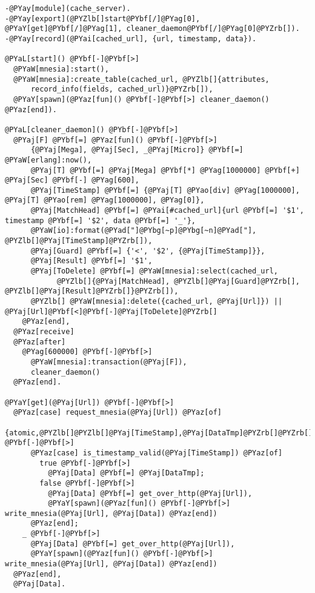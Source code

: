 \begin{Verbatim}[commandchars=@\[\]]
-@PYay[module](cache_server).
-@PYay[export](@PYZlb[]start@PYbf[/]@PYag[0], @PYaY[get]@PYbf[/]@PYag[1], cleaner_daemon@PYbf[/]@PYag[0]@PYZrb[]).
-@PYay[record](@PYai[cached_url], {url, timestamp, data}).

@PYaL[start]() @PYbf[-]@PYbf[>]
  @PYaW[mnesia]:start(),
  @PYaW[mnesia]:create_table(cached_url, @PYZlb[]{attributes,
      record_info(fields, cached_url)}@PYZrb[]),
  @PYaY[spawn](@PYaz[fun]() @PYbf[-]@PYbf[>] cleaner_daemon() @PYaz[end]).

@PYaL[cleaner_daemon]() @PYbf[-]@PYbf[>]
  @PYaj[F] @PYbf[=] @PYaz[fun]() @PYbf[-]@PYbf[>]
      {@PYaj[Mega], @PYaj[Sec], _@PYaj[Micro]} @PYbf[=] @PYaW[erlang]:now(),
      @PYaj[T] @PYbf[=] @PYaj[Mega] @PYbf[*] @PYag[1000000] @PYbf[+] @PYaj[Sec] @PYbf[-] @PYag[600],
      @PYaj[TimeStamp] @PYbf[=] {@PYaj[T] @PYao[div] @PYag[1000000], @PYaj[T] @PYao[rem] @PYag[1000000], @PYag[0]},
      @PYaj[MatchHead] @PYbf[=] @PYai[#cached_url]{url @PYbf[=] '$1', timestamp @PYbf[=] '$2', data @PYbf[=] '_'},
      @PYaW[io]:format(@PYad["]@PYbg[~p]@PYbg[~n]@PYad["], @PYZlb[]@PYaj[TimeStamp]@PYZrb[]),
      @PYaj[Guard] @PYbf[=] {'<', '$2', {@PYaj[TimeStamp]}},
      @PYaj[Result] @PYbf[=] '$1',
      @PYaj[ToDelete] @PYbf[=] @PYaW[mnesia]:select(cached_url,
            @PYZlb[]{@PYaj[MatchHead], @PYZlb[]@PYaj[Guard]@PYZrb[], @PYZlb[]@PYaj[Result]@PYZrb[]}@PYZrb[]),
      @PYZlb[] @PYaW[mnesia]:delete({cached_url, @PYaj[Url]}) || @PYaj[Url]@PYbf[<]@PYbf[-]@PYaj[ToDelete]@PYZrb[]
    @PYaz[end],
  @PYaz[receive]
  @PYaz[after]
    @PYag[600000] @PYbf[-]@PYbf[>]
      @PYaW[mnesia]:transaction(@PYaj[F]),
      cleaner_daemon()
  @PYaz[end].  

@PYaY[get](@PYaj[Url]) @PYbf[-]@PYbf[>]
  @PYaz[case] request_mnesia(@PYaj[Url]) @PYaz[of]
    {atomic,@PYZlb[]@PYZlb[]@PYaj[TimeStamp],@PYaj[DataTmp]@PYZrb[]@PYZrb[]} @PYbf[-]@PYbf[>]
      @PYaz[case] is_timestamp_valid(@PYaj[TimeStamp]) @PYaz[of]
        true @PYbf[-]@PYbf[>]
          @PYaj[Data] @PYbf[=] @PYaj[DataTmp];
        false @PYbf[-]@PYbf[>]
          @PYaj[Data] @PYbf[=] get_over_http(@PYaj[Url]),
          @PYaY[spawn](@PYaz[fun]() @PYbf[-]@PYbf[>] write_mnesia(@PYaj[Url], @PYaj[Data]) @PYaz[end])
      @PYaz[end];
    _ @PYbf[-]@PYbf[>]
      @PYaj[Data] @PYbf[=] get_over_http(@PYaj[Url]),
      @PYaY[spawn](@PYaz[fun]() @PYbf[-]@PYbf[>] write_mnesia(@PYaj[Url], @PYaj[Data]) @PYaz[end])
  @PYaz[end],
  @PYaj[Data].


\end{Verbatim}

